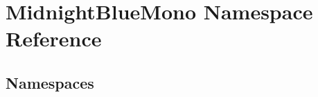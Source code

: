 \hypertarget{namespace_midnight_blue_mono}{}\section{Midnight\+Blue\+Mono Namespace Reference}
\label{namespace_midnight_blue_mono}
\subsection*{Namespaces}
\begin{DoxyCompactItemize}
\end{DoxyCompactItemize}
